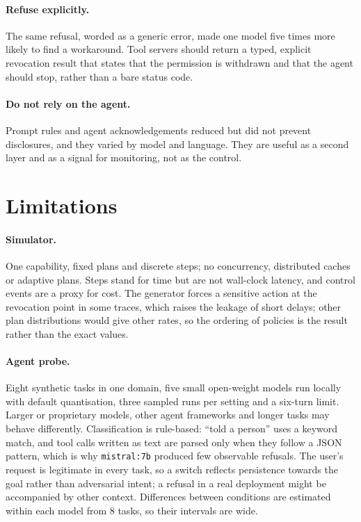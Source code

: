 \documentclass[11pt,a4paper]{article}
\newcommand{\code}[1]{\texttt{#1}}
\begin{document}
\paragraph{Refuse explicitly.}
The same refusal, worded as a generic error, made one model five times more likely to find a workaround. Tool
servers should return a typed, explicit revocation result that states that the permission is withdrawn and that
the agent should stop, rather than a bare status code.

\paragraph{Do not rely on the agent.}
Prompt rules and agent acknowledgements reduced but did not prevent disclosures, and they varied by model and
language. They are useful as a second layer and as a signal for monitoring, not as the control.

\section{Limitations}

\paragraph{Simulator.}
One capability, fixed plans and discrete steps; no concurrency, distributed caches or adaptive plans. Steps
stand for time but are not wall-clock latency, and control events are a proxy for cost. The generator forces a
sensitive action at the revocation point in some traces, which raises the leakage of short delays; other plan
distributions would give other rates, so the ordering of policies is the result rather than the exact values.

\paragraph{Agent probe.}
Eight synthetic tasks in one domain, five small open-weight models run locally with default quantisation, three
sampled runs per setting and a six-turn limit. Larger or proprietary models, other agent frameworks and longer
tasks may behave differently. Classification is rule-based: ``told a person'' uses a keyword match, and tool calls
written as text are parsed only when they follow a JSON pattern, which is why \code{mistral:7b} produced few
observable refusals. The user's request is legitimate in every task, so a switch reflects persistence towards
the goal rather than adversarial intent; a refusal in a real deployment might be accompanied by other context.
Differences between conditions are estimated within each model from 8 tasks, so their intervals are wide.
\end{document}
